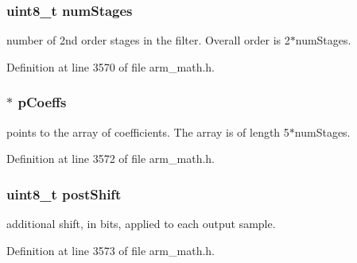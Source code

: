 \subsubsection[{\texorpdfstring{num\+Stages}{numStages}}]{\setlength{\rightskip}{0pt plus 5cm}uint8\+\_\+t num\+Stages}\hypertarget{structarm__biquad__cas__df1__32x64__ins__q31_a3615af038f56917909e0370c11bc2ec7}{}\label{structarm__biquad__cas__df1__32x64__ins__q31_a3615af038f56917909e0370c11bc2ec7}
number of 2nd order stages in the filter. Overall order is 2$\ast$num\+Stages. 

Definition at line 3570 of file arm\+\_\+math.\+h.

\subsubsection[{\texorpdfstring{p\+Coeffs}{pCoeffs}}]{$\ast$ p\+Coeffs}\hypertarget{structarm__biquad__cas__df1__32x64__ins__q31_a68888e36167d81cb7836db10367a1682}{}\label{structarm__biquad__cas__df1__32x64__ins__q31_a68888e36167d81cb7836db10367a1682}
points to the array of coefficients. The array is of length 5$\ast$num\+Stages. 

Definition at line 3572 of file arm\+\_\+math.\+h.

\subsubsection[{\texorpdfstring{post\+Shift}{postShift}}]{\setlength{\rightskip}{0pt plus 5cm}uint8\+\_\+t post\+Shift}\hypertarget{structarm__biquad__cas__df1__32x64__ins__q31_a74050e9f36542bd56f4052381a82ae8f}{}\label{structarm__biquad__cas__df1__32x64__ins__q31_a74050e9f36542bd56f4052381a82ae8f}
additional shift, in bits, applied to each output sample. 

Definition at line 3573 of file arm\+\_\+math.\+h.

